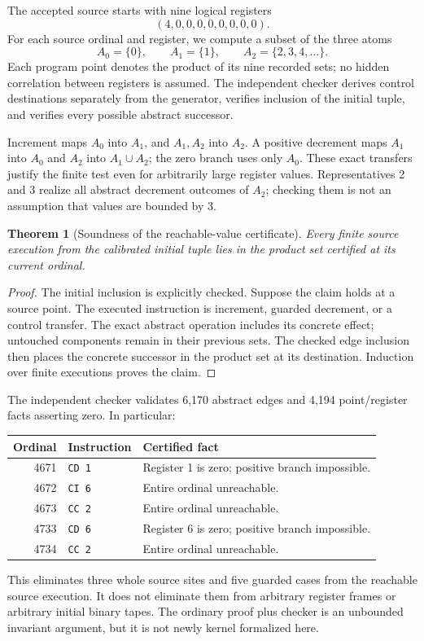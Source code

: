 \documentclass[11pt]{article}
\newtheorem{theorem}{Theorem}[section]
\theoremstyle{remark}\newtheorem{remark}[theorem]{Remark}
\newcommand{\code}[1]{\texttt{\small #1}}
\begin{document}
The accepted source starts with nine logical registers
\[
 (4,0,0,0,0,0,0,0,0).
\]
For each source ordinal and register, we compute a subset of the three atoms
\[
 A_0=\{0\},\qquad A_1=\{1\},\qquad A_2=\{2,3,4,\ldots\}.
\]
Each program point denotes the product of its nine recorded sets; no hidden correlation between registers is assumed. The independent checker derives control destinations separately from the generator, verifies inclusion of the initial tuple, and verifies every possible abstract successor.

Increment maps $A_0$ into $A_1$, and $A_1,A_2$ into $A_2$. A positive decrement maps $A_1$ into $A_0$ and $A_2$ into $A_1\cup A_2$; the zero branch uses only $A_0$. These exact transfers justify the finite test even for arbitrarily large register values. Representatives 2 and 3 realize all abstract decrement outcomes of $A_2$; checking them is not an assumption that values are bounded by 3.

\begin{theorem}[Soundness of the reachable-value certificate]
Every finite source execution from the calibrated initial tuple lies in the product set certified at its current ordinal.
\end{theorem}
\begin{proof}
The initial inclusion is explicitly checked. Suppose the claim holds at a source point. The executed instruction is increment, guarded decrement, or a control transfer. The exact abstract operation includes its concrete effect; untouched components remain in their previous sets. The checked edge inclusion then places the concrete successor in the product set at its destination. Induction over finite executions proves the claim.
\end{proof}

The independent checker validates 6,170 abstract edges and 4,194 point/register facts asserting zero. In particular:
\begin{center}
\begin{tabular}{rll}
\toprule
Ordinal & Instruction & Certified fact \\
\midrule
4671 & \code{CD 1} & Register 1 is zero; positive branch impossible. \\
4672 & \code{CI 6} & Entire ordinal unreachable. \\
4673 & \code{CC 2} & Entire ordinal unreachable. \\
4733 & \code{CD 6} & Register 6 is zero; positive branch impossible. \\
4734 & \code{CC 2} & Entire ordinal unreachable. \\
\bottomrule
\end{tabular}
\end{center}
This eliminates three whole source sites and five guarded cases from the reachable source execution. It does not eliminate them from arbitrary register frames or arbitrary initial binary tapes. The ordinary proof plus checker is an unbounded invariant argument, but it is not newly kernel formalized here.
\end{document}
